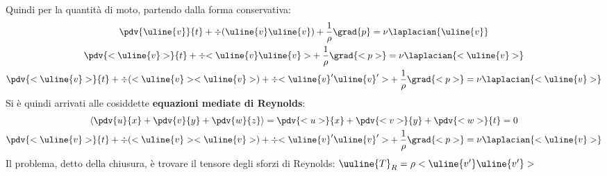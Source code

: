 Quindi per la quantità di moto, partendo dalla forma conservativa:
%
	\begin{equation*}
		\begin{gathered}
			\pdv{\uline{v}}{t} + \div{(\uline{v} \uline{v})} + \frac{1}{\rho} \grad{p} = \nu \laplacian{ \uline{v} }\\
			\pdv{<\uline{v}>}{t} + \div{<\uline{v} \uline{v}>} + \frac{1}{\rho} \grad{<p>} = \nu \laplacian{<\uline{v}>}\\
			\pdv{<\uline{v}>}{t} + \div{(<\uline{v}> <\uline{v}>)} + \div{<\uline{v}' \uline{v}'>} + \frac{1}{\rho} \grad{<p>} = \nu \laplacian{<\uline{v}>}
		\end{gathered}
	\end{equation*}
%
Si è quindi arrivati alle cosiddette \textbf{equazioni mediate di Reynolds}:
%
	\begin{equation*}
		\begin{gathered}
			\left< \pdv{u}{x} + \pdv{v}{y} + \pdv{w}{z} \right> = \pdv{<u>}{x} + \pdv{<v>}{y} + \pdv{<w>}{t} = 0\\
			\pdv{<\uline{v}>}{t} + \div{(<\uline{v}> <\uline{v}>)} + \div{<\uline{v}' \uline{v}'>} + \frac{1}{\rho} \grad{<p>} = \nu \laplacian{<\uline{v}>}
		\end{gathered}
	\end{equation*}
%
Il problema, detto della chiusura, è trovare il tensore degli sforzi di Reynolds: $\uuline{T}_R = \rho <\uline{v'} \uline{v'}>$

